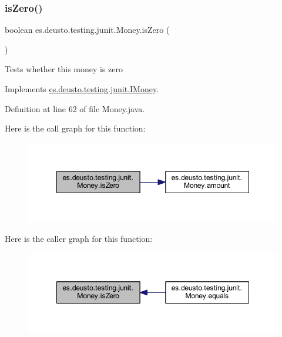 \mbox{\label{classes_1_1deusto_1_1testing_1_1junit_1_1_money_a797658a03260b535e9a36ebbcc3b19c9}} 
\subsubsection{\texorpdfstring{is\+Zero()}{isZero()}}
{\footnotesize\ttfamily boolean es.\+deusto.\+testing.\+junit.\+Money.\+is\+Zero (\begin{DoxyParamCaption}{ }\end{DoxyParamCaption})}

Tests whether this money is zero 

Implements \mbox{\hyperlink{interfacees_1_1deusto_1_1testing_1_1junit_1_1_i_money_a166c39b6f931e49769580a04f8c73500}{es.\+deusto.\+testing.\+junit.\+I\+Money}}.



Definition at line 62 of file Money.\+java.

Here is the call graph for this function\+:
\nopagebreak
\begin{figure}[H]
\begin{center}
\leavevmode
\includegraphics[width=348pt]{classes_1_1deusto_1_1testing_1_1junit_1_1_money_a797658a03260b535e9a36ebbcc3b19c9_cgraph}
\end{center}
\end{figure}
Here is the caller graph for this function\+:
\nopagebreak
\begin{figure}[H]
\begin{center}
\leavevmode
\includegraphics[width=348pt]{classes_1_1deusto_1_1testing_1_1junit_1_1_money_a797658a03260b535e9a36ebbcc3b19c9_icgraph}
\end{center}
\end{figure}
\mbox{\label{classes_1_1deusto_1_1testing_1_1junit_1_1_money_a02c7d4e9013710f70d1d46e9c9ebae88}} 
